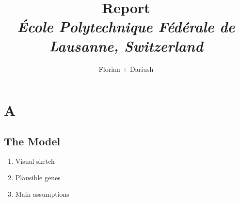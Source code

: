 \documentclass[10pt,a4paper,oneside,twocolumn]{article} %
\numberwithin{equation}{section} %
\begin{document}
\title{\huge{\textbf{Report}}\\
	\vspace{0.5cm}
	\Large{\textit{\'Ecole Polytechnique F\'ed\'erale de Lausanne, Switzerland}}}
\author{\large{Florian + Dariush}}

\begin{titlepage}
 \maketitle
\thispagestyle{empty}
\end{titlepage}

\section{A}
    \subsection{The Model}
	\begin{enumerate}
	    \item Visual sketch
	    \item Plausible genes
	    \item Main assumptions
	\end{enumerate}
\end{document}
